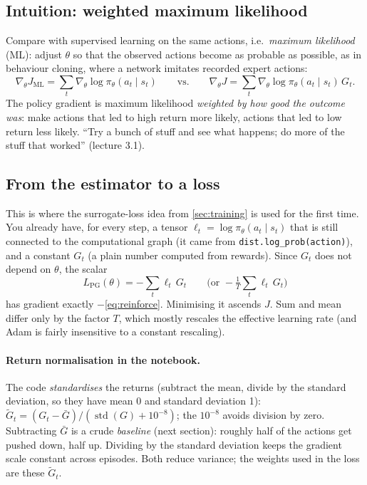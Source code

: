 \documentclass[11pt,a4paper]{article}
\newcommand{\pit}{\pi_\theta}
\newcommand{\gradt}{\nabla_\theta}
\newcommand{\code}[1]{\texttt{#1}}
\begin{document}
\subsection{Intuition: weighted maximum likelihood}
Compare with supervised learning on the same actions, i.e.\ \emph{maximum likelihood} (ML): adjust $\theta$ so that the observed actions become as probable as possible, as in behaviour cloning, where a network imitates recorded expert actions:
\[
  \gradt J_{\mathrm{ML}} = \sum_t\gradt\log\pit(a_t\mid s_t)
  \qquad\text{vs.}\qquad
  \gradt J = \sum_t\gradt\log\pit(a_t\mid s_t)\,G_t .
\]
The policy gradient is maximum likelihood \emph{weighted by how good the outcome was}: make actions that led to high return more likely, actions that led to low return less likely.
\enquote{Try a bunch of stuff and see what happens; do more of the stuff that worked} (lecture 3.1).

\subsection{From the estimator to a loss}
This is where the surrogate-loss idea from \cref{sec:training} is used for the first time. You already have, for every step, a tensor $\ell_t=\log\pit(a_t\mid s_t)$ that is still connected to the computational graph (it came from \code{dist.log\_prob(action)}), and a constant $G_t$ (a plain number computed from rewards).
Since $G_t$ does not depend on $\theta$, the scalar
\begin{equation}
  L_{\mathrm{PG}}(\theta) = -\sum_t \ell_t\, G_t \qquad\Big(\text{or } -\tfrac{1}{T}\textstyle\sum_t \ell_t\,G_t\Big)
\end{equation}
has gradient exactly $-$\eqref{eq:reinforce}. Minimising it ascends $J$. Sum and mean differ only by the factor $T$, which mostly rescales the effective learning rate (and Adam is fairly insensitive to a constant rescaling).

\paragraph{Return normalisation in the notebook.}
The code \emph{standardises} the returns (subtract the mean, divide by the standard deviation, so they have mean 0 and standard deviation 1): $\tilde G_t = (G_t-\bar G)/(\operatorname{std}(G)+10^{-8})$; the $10^{-8}$ avoids division by zero.
Subtracting $\bar G$ is a crude \emph{baseline} (next section): roughly half of the actions get pushed down, half up.
Dividing by the standard deviation keeps the gradient scale constant across episodes. Both reduce variance; the weights used in the loss are these $\tilde G_t$.
\end{document}
